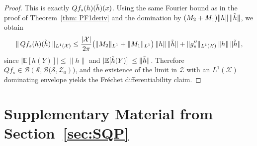 \documentclass[12pt,leqno]{amsart}
\begin{document}
\begin{proof}
This is exactly $Qf_s(h)(\Tilde h)(x)$.
Using the same Fourier bound as in the proof of Theorem~\ref{thm: PF1deriv} and the domination by
$(M_2+M_1)\|h\|\,\|\Tilde h\|$, we obtain
\[
\|\,Qf_s(h)(\Tilde h)\,\|_{L^1(\mathcal{X})}
\le
\frac{|\mathcal{X}|}{2\pi}\big(\|M_2\|_{L^1}+\|M_1\|_{L^1}\big)\,\|h\|\,\|\Tilde h\|
+\|g_s''\|_{L^1(\mathcal{X})}\,\|h\|\,\|\Tilde h\|,
\]
since $|\mathbb E[h(Y)]|\le \|h\|$ and $|\mathbb E[\Tilde h(Y)]|\le \|\Tilde h\|$.
Therefore $Qf_s\in \mathcal{B}(\mathcal{S},\mathcal{B}\big(\mathcal{S},\mathcal{Z}_0)\big)$, and the existence of the limit
in $\mathcal{Z}$ with an $L^1(\mathcal{X})$ dominating envelope yields the Fr\'echet differentiability claim.
\end{proof}


\section{Supplementary Material from Section~\ref{sec:SQP}}\label{proof:loc}
\end{document}
